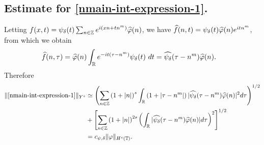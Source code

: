 %
%
%
%
%
%
%
%
\subsection{Estimate for \eqref{nmain-int-expression-1}.}
%
%
Letting $f(x,t) = \psi_{\delta}(t) \sum_{n \in \mathbb{Z}} e^{i(xn + tn^{m})} 
\widehat{\varphi}(n)$, we have $\widehat{f}(n,t) = \psi_{\delta}(t) \widehat{\varphi}(n) e^{itn^{m}}$,
from which we obtain
%
%
\begin{equation}
	\label{nfourier-trans-calc}
	\begin{split}
		\widehat{f}(n, \tau)
		& = \widehat{\varphi}(n) \int_{\mathbb{R}} e^{-it( \tau - n^{m})} 
		\psi_{\delta}(t) \ d t
    = \widehat{\psi_{\delta}}(\tau - n^{m}) \widehat{\varphi}(n).
	\end{split}
\end{equation}
%
%
%
%
%
%
Therefore
%
\begin{equation}
	\begin{split}
	\label{nmain-int1-est}
		\|\eqref{nmain-int-expression-1}\|_{Y^s}
		& \simeq \left (  \sum_{n\in \mathbb{Z}} \left (1 + |n| \right )^s \int_{\mathbb{R}} \left( 1 + | \tau - n^{m} 
		| \right )
    | \widehat{\psi_{\delta}}(\tau - n^{m}) \widehat{\varphi}(n) |^2 d \tau \right)^{1/2} 
		\\
		& + \left[ \sum_{n \in \mathbb{Z} }\left( 1 + | n | \right)^{2s} \left( \int_{\mathbb{R}} |
    \widehat{\psi_{\delta}}(\tau - n^{m})\widehat{\varphi}(n) | d \tau
		\right)^{2} \right]^{1/2}
		\\
    & = c_{\psi, \delta}
		\|\varphi\|_{H^s(\mathbb{T})}.
	\end{split}
\end{equation}
%
%
%
%
